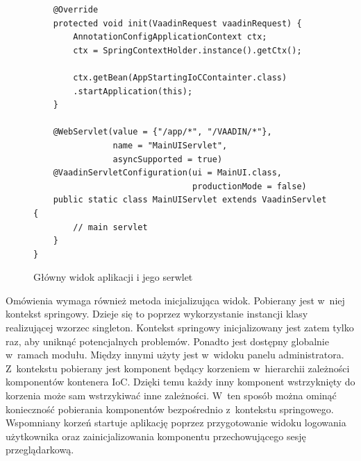 \documentclass[a4paper]{book}
\begin{document}
{\begin{figure}
\begin{lstlisting}
	@Override
	protected void init(VaadinRequest vaadinRequest) {
		AnnotationConfigApplicationContext ctx;
		ctx = SpringContextHolder.instance().getCtx();
		
		ctx.getBean(AppStartingIoCContainter.class)
		.startApplication(this);
	}
	
	@WebServlet(value = {"/app/*", "/VAADIN/*"},
	            name = "MainUIServlet",
	            asyncSupported = true)
	@VaadinServletConfiguration(ui = MainUI.class,
	                            productionMode = false)
	public static class MainUIServlet extends VaadinServlet {
		// main servlet
	}
}
\end{lstlisting}
\caption{Główny widok aplikacji i jego serwlet}
\label{id:fig:listing:VaadinInitMain}
\end{figure}

Omówienia wymaga również metoda inicjalizująca widok. Pobierany jest w~niej kontekst springowy. Dzieje się to poprzez wykorzystanie instancji klasy realizującej wzorzec singleton. Kontekst springowy inicjalizowany jest zatem tylko raz, aby uniknąć potencjalnych problemów. Ponadto jest dostępny globalnie w~ramach modułu. Między innymi użyty jest w~widoku panelu administratora. Z~kontekstu pobierany jest komponent będący korzeniem w~hierarchii zależności komponentów kontenera IoC. Dzięki temu każdy inny komponent wstrzyknięty do korzenia może sam wstrzykiwać inne zależności. W~ten sposób można ominąć konieczność pobierania komponentów bezpośrednio z~kontekstu springowego. Wspomniany korzeń startuje aplikację poprzez przygotowanie widoku logowania użytkownika oraz zainicjalizowania komponentu przechowującego sesję przeglądarkową.

}
\end{document}
